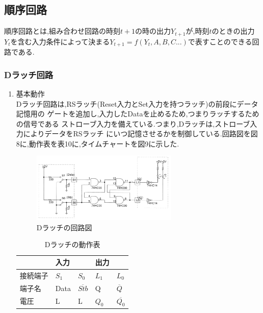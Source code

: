 \documentclass[twocolumn, 10pt,a4j]{jsarticle}
\begin{document}
\subsection{順序回路}
  順序回路とは,組み合わせ回路の時刻$t+1$の時の出力$Y_{t+1}$が,時刻$t$のときの出力
  $Y_{t}$を含む入力条件によって決まる$Y_{t+1} = f(Y_{t},A,B,C...)$で表すことのできる回路である.
  \subsubsection{Dラッチ回路}
    \begin{enumerate}
      \item 基本動作 \\
      Dラッチ回路は,RSラッチ(Reset入力とSet入力を持つラッチ)の前段にデータ記憶用の
      ゲートを追加し,入力したDataを止めるため,つまりラッチするための信号である
      ストローブ入力を備えている.つまり,Dラッチは,ストローブ入力によりデータをRSラッチ
      にいつ記憶させるかを制御している.回路図を図8に,動作表を表10に,タイムチャートを図9に示した.
      \begin{figure}[H]
        \begin{center}
          \includegraphics[width=7cm]{../img/junjokairo/d_ratch.png}
          \caption{Dラッチの回路図}
        \end{center}
      \end{figure}
      \begin{table}[H]
        \centering
        \caption{Dラッチの動作表}
        \label{my-label}
        \footnotesize
          \begin{tabular}{l|ll|ll}
              & 入力      &                                 & 出力                           &                                      \\ \hline
          接続端子 & $S_{1}$ & $S_{0}$                         & $L_{1}$ & $L_{0}$                              \\ \hline
          端子名  & Data    & $\overline{Stb}$              & Q       & $\overline{Q}$        \\ \hline
          電圧   & L       & L                               & $Q_{0}$ & $\overline{Q_{0}}$ \\

\end{tabular}
\end{table}
\end{enumerate}
\end{document}
